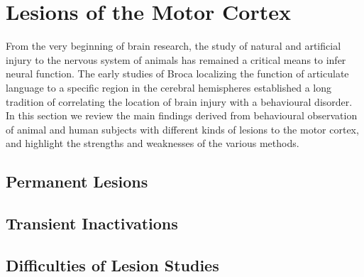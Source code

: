 \section{Lesions of the Motor Cortex}

From the very beginning of brain research, the study of natural and artificial injury to the nervous system of animals has remained a critical means to infer neural function. The early studies of Broca localizing the function of articulate language to a specific region in the cerebral hemispheres \cite{Broca1861} established a long tradition of correlating the location of brain injury with a behavioural disorder. In this section we review the main findings derived from behavioural observation of animal and human subjects with different kinds of lesions to the motor cortex, and highlight the strengths and weaknesses of the various methods.

\subsection{Permanent Lesions}

\subsection{Transient Inactivations}

\subsection{Difficulties of Lesion Studies}
